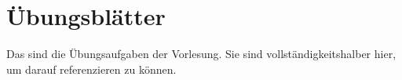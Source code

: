 \section{Übungsblätter}
Das sind die Übungsaufgaben der Vorlesung. Sie sind vollständigkeitshalber hier, um darauf referenzieren zu können.
\blatt

\blatt

\blatt

\blatt

\blatt

